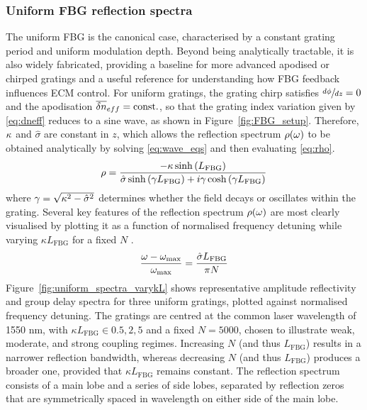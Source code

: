 \subsubsection*{Uniform FBG reflection spectra}
\label{subsubsec:FBG_feedback}
%
The uniform FBG is the canonical case, characterised by a constant grating period and uniform modulation depth.
Beyond being analytically tractable, it is also widely fabricated, providing a baseline for more advanced apodised or chirped gratings and a useful reference for understanding how FBG feedback influences ECM control.
For uniform gratings, the grating chirp satisfies $\sfrac{d\phi}{dz} = 0$ and the apodisation $\overline{\delta n}_{eff} = \text{const.}$, so that the grating index variation given by \eqref{eq:dneff} reduces to a sine wave, as shown in Figure~\ref{fig:FBG_setup}.
Therefore, $\kappa$ and $\hat{\sigma}$ are constant in $z$, which allows the reflection spectrum $\rho(\omega)$ to be obtained analytically by solving \eqref{eq:wave_eqs} and then evaluating \eqref{eq:rho}.
%
\begin{equation}
\label{eq:uniform_rho}
    \rho = \frac{-\kappa \sinh\left( L_\text{FBG}\right)}{\hat{\sigma} \sinh\left(\gamma L_\text{FBG}\right) + i\gamma \cosh\left(\gamma L_\text{FBG}\right)}
\end{equation}
%
where $\gamma = \sqrt{\kappa^2 - \hat{\sigma}^2}$ determines whether the field decays or oscillates within the grating.
Several key features of the reflection spectrum $\rho(\omega)$ are most clearly visualised by plotting it as a function of normalised frequency detuning while varying $\kappa L_\text{FBG}$ for a fixed $N$ \cite{erdogan1997fibre}.
%
\begin{equation*}
    \frac{\omega - \omega_\text{max}}{\omega_\text{max}} = \frac{\hat{\sigma} L_\text{FBG}  }{\pi N}
\end{equation*}
%
Figure~\ref{fig:uniform_spectra_varykL} shows representative amplitude reflectivity and group delay spectra for three uniform gratings, plotted against normalised frequency detuning.
The gratings are centred at the common laser wavelength of 1550 nm, with $\kappa L_\text{FBG} \in {0.5, 2, 5}$ and a fixed $N = 5000$, chosen to illustrate weak, moderate, and strong coupling regimes.
Increasing $N$ (and thus $L_\text{FBG}$) results in a narrower reflection bandwidth, whereas decreasing $N$ (and thus $L_\text{FBG}$) produces a broader one, provided that $\kappa L_\text{FBG}$ remains constant.
The reflection spectrum consists of a main lobe and a series of side lobes, separated by reflection zeros that are symmetrically spaced in wavelength on either side of the main lobe.
